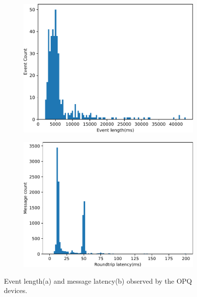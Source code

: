 \begin{figure}[h]
    \centering
    \begin{subfigure}{.45\textwidth}
        \centering
        \includegraphics[width=1\linewidth]{img/napali_eval/event_length.pdf}
        \caption{}
        \label{expdes:fig:event_length}
    \end{subfigure}\hspace{5mm}
    \begin{subfigure}{.45\textwidth}
        \centering
        \includegraphics[width=1\linewidth]{img/napali_eval/latency.pdf}
        \caption{}
        \label{expdes:fig:latency}
    \end{subfigure}
    \caption{Event length(a) and message latency(b) observed by the OPQ devices.}

    \label{expdes:fig:el_la}
\end{figure}

